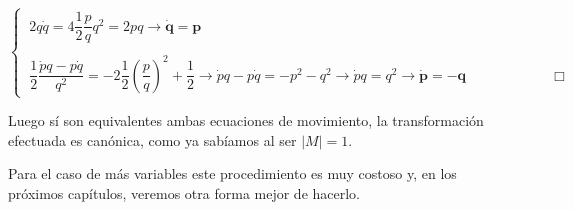 $\begin{cases}
\ 2q\dot q = 4 \dfrac 1 2 \dfrac p q q^2 =2pq \to \boldsymbol{\dot q = p}	
\\ \\
\ \dfrac 1 2 \dfrac{\dot p q - p \dot q}{q^2} = -2 \dfrac 1 2 \left(\dfrac p q \right)^2 + \dfrac 1 2  \to \dot p q-p \dot q = -p^2-q^2 \to \dot p q=q^2 \to  \boldsymbol{\dot p =-q} \qquad \qquad  \qquad  \Box
\end{cases}$

Luego sí son equivalentes ambas ecuaciones de movimiento, la transformación efectuada es canónica, como ya sabíamos al ser $|M|=1$.

\vspace{1cm}
\begin{ejemplo}
Para el caso de más variables este procedimiento es muy costoso y, en los próximos capítulos, veremos otra forma mejor de hacerlo.	
\end{ejemplo}

\vspace{5mm}


